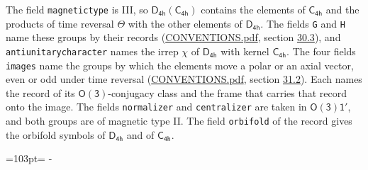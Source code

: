 \documentclass[10pt,a4paper]{article}
\newcommand{\needspace}[1]{\par\penalty-100\begingroup\dimen0=#1\relax\dimen2=\pagegoal
  \advance\dimen2-\pagetotal\ifdim\dimen0>\dimen2\relax\ifdim\dimen2>0pt\vfil\break\fi\fi
  \endgroup}
\numberwithin{equation}{section}
\newcommand{\grp}[1]{\mathsf{#1}}
\begin{document}
The field \texttt{magnetictype} is III, so $\grp{D_{4h}}(\grp{C_{4h}})$ contains the elements of $\grp{C_{4h}}$ and the products of time reversal $\varTheta$ with the other elements of $\grp{D_{4h}}$. The fields \texttt{G} and \texttt{H} name these groups by their records (\href{../../CONVENTIONS.pdf}{CONVENTIONS.pdf}, section \href{../../CONVENTIONS.pdf\#conv.30.3}{30.3}), and \texttt{antiunitarycharacter} names the irrep $\chi$ of $\grp{D_{4h}}$ with kernel $\grp{C_{4h}}$. The four fields \texttt{images} name the groups by which the elements move a polar or an axial vector, even or odd under time reversal (\href{../../CONVENTIONS.pdf}{CONVENTIONS.pdf}, section \href{../../CONVENTIONS.pdf\#conv.31.2}{31.2}). Each names the record of its $\grp{O(3)}$-conjugacy class and the frame that carries that record onto the image. The fields \texttt{normalizer} and \texttt{centralizer} are taken in $\grp{O(3)1'}$, and both groups are of magnetic type II. The field \texttt{orbifold} of the record gives the orbifold symbols of $\grp{D_{4h}}$ and of $\grp{C_{4h}}$.
\needspace{103pt}
\end{document}
